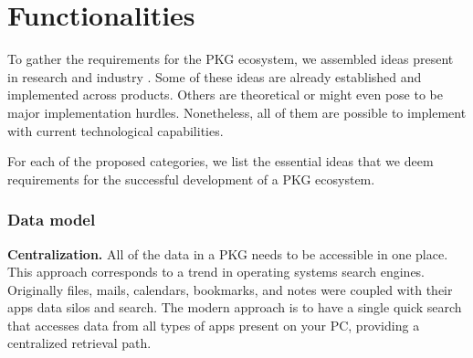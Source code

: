 


\section{Functionalities}

To gather the requirements for the PKG ecosystem, we assembled ideas present in research and industry \cite{Bush1945Memex, Davies2005Memex60, Matuschak2019TTFT,jones2007PIM}. Some of these ideas are already established and implemented across products. Others are theoretical or might even pose to be major implementation hurdles. Nonetheless, all of them are possible to implement with current technological capabilities.

For each of the proposed categories, we list the essential ideas that we deem requirements for the successful development of a PKG ecosystem.

\subsubsection*{Data model}

\textbf{Centralization.} All of the data in a PKG needs to be accessible in one place. This approach corresponds to a trend in operating systems search engines. Originally files, mails, calendars, bookmarks, and notes were coupled with their apps data silos and search. The modern approach is to have a single quick search that accesses data from all types of apps present on your PC, providing a centralized retrieval path.

